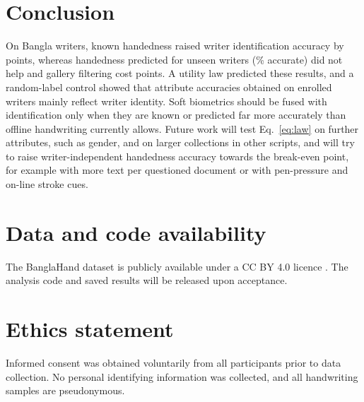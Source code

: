 \documentclass[conference]{IEEEtran}
\begin{document}
\section{Conclusion}
On \vnWriters{} Bangla writers, known handedness raised writer identification accuracy by \vOracleGain{} points, whereas handedness predicted for unseen writers (\vHandOwn\% accurate) did not help and gallery filtering cost \vFilterLoss{} points. A utility law predicted these results, and a random-label control showed that attribute accuracies obtained on enrolled writers mainly reflect writer identity. Soft biometrics should be fused with identification only when they are known or predicted far more accurately than offline handwriting currently allows. Future work will test Eq.~\eqref{eq:law} on further attributes, such as gender, and on larger collections in other scripts, and will try to raise writer-independent handedness accuracy towards the break-even point, for example with more text per questioned document or with pen-pressure and on-line stroke cues.

\section*{Data and code availability}
The BanglaHand dataset is publicly available under a CC BY 4.0 licence \cite{banglahand2026dataset}. The analysis code and saved results will be released upon acceptance.

\section*{Ethics statement}
Informed consent was obtained voluntarily from all participants prior to data collection. No personal identifying information was collected, and all handwriting samples are pseudonymous.



\end{document}
